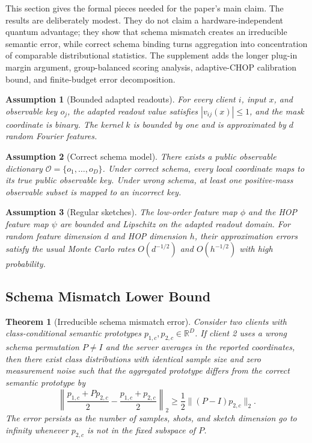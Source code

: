 \documentclass[preprint]{elsarticle}
\newcommand{\R}{\mathbb{R}}
\newcommand{\cO}{\mathcal{O}}
\newtheorem{theorem}{Theorem}
\newtheorem{assumption}{Assumption}
\begin{document}
This section gives the formal pieces needed for the paper's main claim. The results are deliberately modest. They do not claim a hardware-independent quantum advantage; they show that schema mismatch creates an irreducible semantic error, while correct schema binding turns aggregation into concentration of comparable distributional statistics. The supplement adds the longer plug-in margin argument, group-balanced scoring analysis, adaptive-CHOP calibration bound, and finite-budget error decomposition.

\begin{assumption}[Bounded adapted readouts]
For every client \(i\), input \(x\), and observable key \(o_j\), the adapted readout value satisfies \(|v_{ij}(x)|\le 1\), and the mask coordinate is binary. The kernel \(k\) is bounded by one and is approximated by \(d\) random Fourier features.
\end{assumption}

\begin{assumption}[Correct schema model]
There exists a public observable dictionary \(\cO=\{o_1,\ldots,o_D\}\). Under correct schema, every local coordinate maps to its true public observable key. Under wrong schema, at least one positive-mass observable subset is mapped to an incorrect key.
\end{assumption}

\begin{assumption}[Regular sketches]
The low-order feature map \(\phi\) and the HOP feature map \(\psi\) are bounded and Lipschitz on the adapted readout domain. For random feature dimension \(d\) and HOP dimension \(h\), their approximation errors satisfy the usual Monte Carlo rates \(O(d^{-1/2})\) and \(O(h^{-1/2})\) with high probability.
\end{assumption}

\subsection{Schema Mismatch Lower Bound}

\begin{theorem}[Irreducible schema mismatch error]
Consider two clients with class-conditional semantic prototypes \(p_{1,c},p_{2,c}\in\R^D\). If client 2 uses a wrong schema permutation \(P\neq I\) and the server averages in the reported coordinates, then there exist class distributions with identical sample size and zero measurement noise such that the aggregated prototype differs from the correct semantic prototype by
\begin{equation}
    \left\|
    \frac{p_{1,c}+Pp_{2,c}}{2}
    -
    \frac{p_{1,c}+p_{2,c}}{2}
    \right\|_2
    \ge
    \frac{1}{2}\|(P-I)p_{2,c}\|_2.
\end{equation}
The error persists as the number of samples, shots, and sketch dimension go to infinity whenever \(p_{2,c}\) is not in the fixed subspace of \(P\).
\end{theorem}
\end{document}
